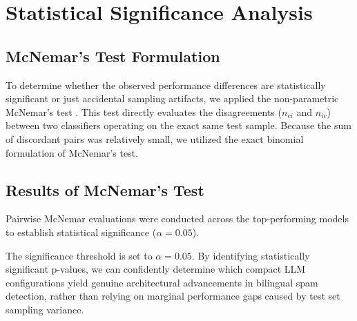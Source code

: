 \documentclass[journal]{IEEEtran}
\begin{document}
\section{Statistical Significance Analysis}

\subsection{McNemar's Test Formulation}

To determine whether the observed performance differences are statistically significant or just accidental sampling artifacts, we applied the non-parametric McNemar's test \cite{ref17}. This test directly evaluates the disagreements ($n_{ci}$ and $n_{ic}$) between two classifiers operating on the exact same test sample. Because the sum of discordant pairs was relatively small, we utilized the exact binomial formulation of McNemar's test.

\subsection{Results of McNemar's Test}

Pairwise McNemar evaluations were conducted across the top-performing models to establish statistical significance ($\alpha = 0.05$).

\begin{table}[htbp]
\caption{McNemar's Test Results for Pairwise Model Significance}
\label{tab:mcnemar_results}
\centering
{}
\end{table}

The significance threshold is set to $\alpha = 0.05$. By identifying statistically significant p-values, we can confidently determine which compact LLM configurations yield genuine architectural advancements in bilingual spam detection, rather than relying on marginal performance gaps caused by test set sampling variance.
\end{document}
